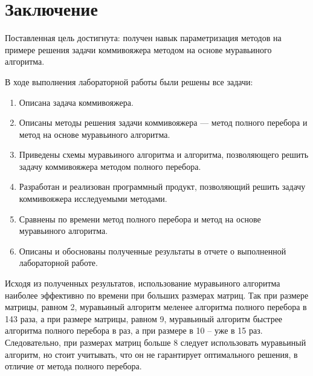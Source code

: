 \chapter*{Заключение}

Поставленная цель достигнута: получен навык параметризация методов на примере решения задачи коммивояжера методом на основе муравьиного алгоритма. 

В ходе выполнения лабораторной работы были решены все задачи:

\begin{enumerate}
	\item Описана задача коммивояжера.
	\item Описаны методы решения задачи коммивояжера --- метод полного перебора и метод на основе муравьиного алгоритма.
	\item Приведены схемы муравьиного алгоритма и алгоритма, позволяющего решить задачу коммивояжера методом полного перебора.
	\item Разработан и реализован программный продукт, позволяющий решить задачу коммивояжера исследуемыми методами.
	\item Сравнены по времени метод полного перебора и метод на основе муравьиного алгоритма.
	\item Описаны и обоснованы полученные результаты в отчете о выполненной лабораторной работе.
\end{enumerate}

Исходя из полученных результатов, использование муравьиного алгоритма наиболее эффективно по времени при больших размерах матриц. Так при размере матрицы, равном 2, муравьиный алгоритм меленее алгоритма полного перебора в 143 раза, а при размере матрицы, равном 9, муравьиный алгоритм быстрее алгоритма полного перебора в раз, а при размере в 10 -- уже в 15 раз. Следовательно, при размерах матриц больше 8 следует использовать муравьиный алгоритм, но стоит учитывать, что он не гарантирует оптимального решения, в отличие от метода полного перебора.